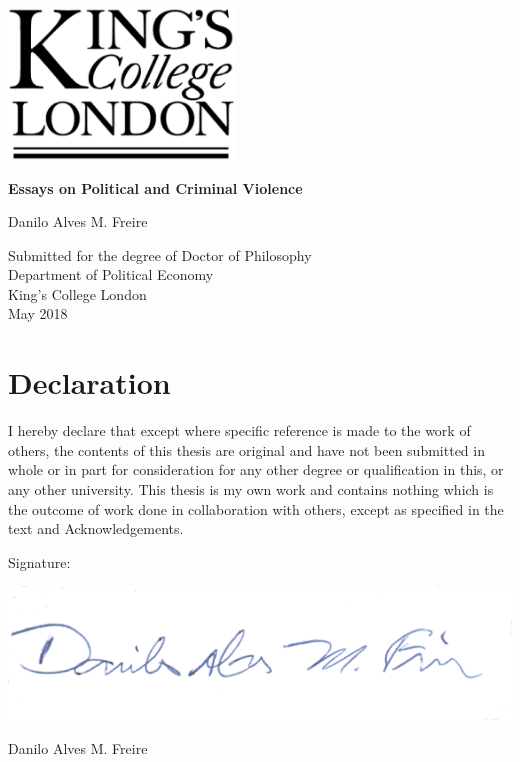 \documentclass[a4paper,12pt]{report}
\begin{document}


\thispagestyle{empty}
\begin{center}
\includegraphics[width=6cm]{images/kcl.eps}
\end{center}	
\vskip40mm
\begin{center}

\huge\textbf{Essays on Political and Criminal Violence}
\vskip2mm
\vskip5mm

\Large Danilo Alves M. Freire
\normalsize
\vfill
\large

Submitted for the degree of Doctor of Philosophy \\
Department of Political Economy \\
King's College London	\\

May 2018
\end{center}	

\chapter*{Declaration}
\noindent 
I hereby declare that except where specific reference is made to the work of others, the contents of this thesis are original and have not been submitted in whole or in part for consideration for any other degree or qualification in this, or any other university. This thesis is my own work and contains nothing which is the outcome of work done in collaboration with others, except as specified in the text and Acknowledgements. 

\vskip20mm
\noindent
Signature:
\vskip10mm
\begin{flushleft}
\includegraphics[scale=.25]{images/sig.pdf}
\end{flushleft}
\noindent 
Danilo Alves M. Freire
\end{document}
